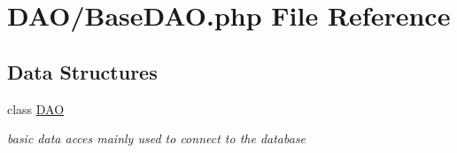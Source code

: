 \hypertarget{_base_d_a_o_8php}{}\section{D\+A\+O/\+Base\+D\+AO.php File Reference}
\label{_base_d_a_o_8php}
\subsection*{Data Structures}
\begin{DoxyCompactItemize}
\item 
class \hyperlink{class_d_a_o}{D\+AO}
\begin{DoxyCompactList}\small\item\em basic data acces mainly used to connect to the database \end{DoxyCompactList}\end{DoxyCompactItemize}
